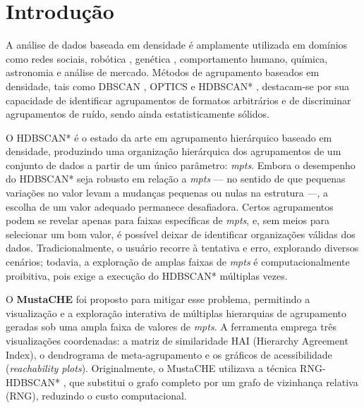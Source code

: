 \documentclass[12pt,a4paper,oneside]{article}
\let\cite\citep
\begin{document}
\section{Introdução}

A análise de dados baseada em densidade é amplamente utilizada em domínios como redes sociais,
robótica \cite{savoie2019robot}, genética \cite{norman2019exploring}, comportamento humano,
química, astronomia e análise de mercado. Métodos de agrupamento baseados em densidade, tais
como DBSCAN \cite{ester1996density}, OPTICS \cite{ankerst1999optics} e HDBSCAN*
\cite{campello2015hierarchical}, destacam-se por sua capacidade de identificar agrupamentos de
formatos arbitrários e de discriminar agrupamentos de ruído, sendo ainda estatisticamente
sólidos.

O HDBSCAN* é o estado da arte em agrupamento hierárquico baseado em densidade, produzindo uma
organização hierárquica dos agrupamentos de um conjunto de dados a partir de um único
parâmetro: \textit{mpts}. Embora o desempenho do HDBSCAN* seja robusto em relação a
\textit{mpts} --- no sentido de que pequenas variações no valor levam a mudanças pequenas ou
nulas na estrutura ---, a escolha de um valor adequado permanece desafiadora. Certos
agrupamentos podem se revelar apenas para faixas específicas de \textit{mpts}, e, sem meios
para selecionar um bom valor, é possível deixar de identificar organizações válidas dos dados.
Tradicionalmente, o usuário recorre à tentativa e erro, explorando diversos cenários; todavia,
a exploração de amplas faixas de \textit{mpts} é computacionalmente proibitiva, pois exige a
execução do HDBSCAN* múltiplas vezes.

O \textbf{MustaCHE} \cite{neto2018mustache} foi proposto para mitigar esse problema,
permitindo a visualização e a exploração interativa de múltiplas hierarquias de agrupamento
geradas sob uma ampla faixa de valores de \textit{mpts}. A ferramenta emprega três
visualizações coordenadas: a matriz de similaridade HAI (Hierarchy Agreement Index), o
dendrograma de meta-agrupamento e os gráficos de acessibilidade (\textit{reachability plots}).
Originalmente, o MustaCHE utilizava a técnica RNG-HDBSCAN* \cite{neto2017efficient}, que
substitui o grafo completo por um grafo de vizinhança relativa (RNG), reduzindo o custo
computacional.
\end{document}
